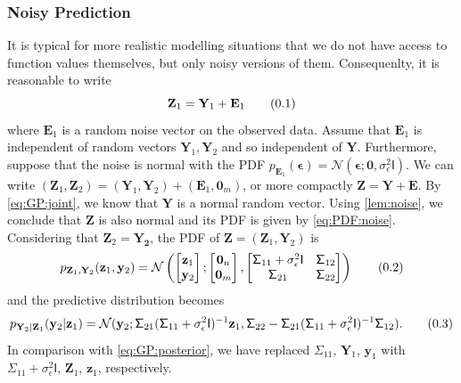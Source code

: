 \documentclass[10pt]{article}
\theoremstyle{definition}
\newcommand\eqnum{\addtocounter{equation}{1}\tag{\arabic{section}.\arabic{equation}}}
\begin{document}
\subsubsection{Noisy Prediction}\label{sec:Noisy:Pred}
It is typical for more realistic modelling situations that we do not have access to function values themselves, but only noisy versions of them. Consequenlty, it is reasonable to write
\begin{equation*}
\mathbf{Z}_{1} = \mathbf{Y}_{1} + \mathbf{E}_1
\eqnum
\end{equation*}
where $\mathbf{E}_1$ is a random noise vector on the observed data. Assume that $\mathbf{E}_1$ is independent of random vectors $\mathbf{Y}_1, \mathbf{Y}_2$ and so independent of $\mathbf{Y}$. Furthermore, suppose that the noise is normal with the PDF $p_{\mathbf{E}_1}(\boldsymbol{\epsilon})=\mathcal{N}(\boldsymbol{\epsilon}; \mathbf{0}, \sigma_{\epsilon}^2\mathsf{I})$. We can write $(\mathbf{Z}_1, \mathbf{Z}_2) = (\mathbf{Y}_1, \mathbf{Y}_2) + (\mathbf{E}_1, \mathbf{0}_m)$, or more compactly $\mathbf{Z} = \mathbf{Y} + \mathbf{E}$. By \cref{eq:GP:joint}, we know that $\mathbf{Y}$ is a normal random vector.  Using \cref{lem:noise}, we conclude that $\mathbf{Z}$ is also normal and its PDF is given by \cref{eq:PDF:noise}. Considering that $\mathbf{Z}_2=\mathbf{Y_2}$, the PDF of $\mathbf{Z}=(\mathbf{Z}_1, \mathbf{Y}_2)$ is
\begin{equation*}
p_{\mathbf{Z}_{1}, \mathbf{Y}_{2}}(\mathbf{z}_{1}, \mathbf{y}_{2}) =
\mathcal{N} \left(
\begin{bmatrix}
\mathbf{z}_1 \\
\mathbf{y}_2
\end{bmatrix} ;
\begin{bmatrix}
\mathbf{0}_n \\
\mathbf{0}_m
\end{bmatrix} ,
\begin{bmatrix}
\mathsf{\Sigma}_{11}+\sigma_{\epsilon}^2\mathsf{I} & \mathsf{\Sigma}_{12} \\
\mathsf{\Sigma}_{21} & \mathsf{\Sigma}_{22} 
\end{bmatrix}
\right) 
\eqnum
\label{eq:GP:noise:joint}
\end{equation*}
and the predictive distribution becomes
\begin{equation*}
p_{\mathbf{Y}_2|\mathbf{Z}_1}(\mathbf{y}_2|\mathbf{z}_1) =
\mathcal{N}(\mathbf{y}_2; 
\mathsf{\Sigma}_{21}(\mathsf{\Sigma}_{11} + \sigma_{\epsilon}^2\mathsf{I})^{-1}\mathbf{z}_1, 
\mathsf{\Sigma}_{22} - \mathsf{\Sigma}_{21} (\mathsf{\Sigma}_{11}+\sigma_{\epsilon}^2\mathsf{I})^{-1} \mathsf{\Sigma}_{12}).
\eqnum
\label{eq:GP:posterior:noise}
\end{equation*}
In comparison with \cref{eq:GP:posterior}, we have replaced $\mathsf{\Sigma}_{11}$, $\mathbf{Y}_1$,  $\mathbf{y}_1$ with $\mathsf{\Sigma}_{11}+\sigma_{\epsilon}^2\mathsf{I}$,  $\mathbf{Z}_1$, $\mathbf{z}_1$, respectively.
\end{document}

